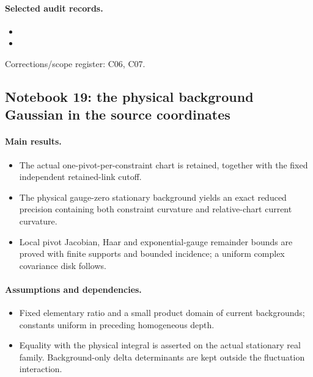 \paragraph{Selected audit records.}
\begingroup\small
\begin{itemize}
\item {}
\item {}
\end{itemize}
\endgroup
Corrections/scope register: C06, C07.\par

\subsection{Notebook 19: the physical background Gaussian in the source coordinates}
\label{hnc-19}
\noindent{}\par

\paragraph{Main results.}
\begin{itemize}
\item The actual one-pivot-per-constraint chart is retained, together with the fixed independent retained-link cutoff.
\item The physical gauge-zero stationary background yields an exact reduced precision containing both constraint curvature and relative-chart current curvature.
\item Local pivot Jacobian, Haar and exponential-gauge remainder bounds are proved with finite supports and bounded incidence; a uniform complex covariance disk follows.
\end{itemize}

\paragraph{Assumptions and dependencies.}
\begin{itemize}
\item Fixed elementary ratio and a small product domain of current backgrounds; constants uniform in preceding homogeneous depth.
\item Equality with the physical integral is asserted on the actual stationary real family. Background-only delta determinants are kept outside the fluctuation interaction.
\end{itemize}

